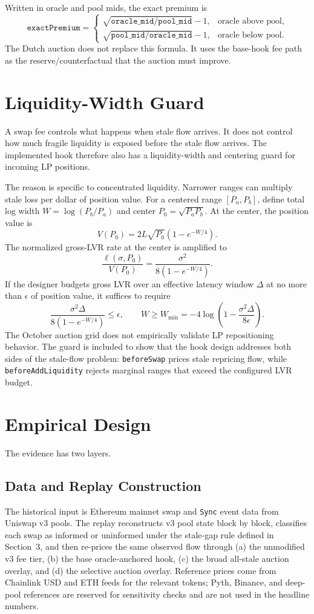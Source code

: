 \documentclass[11pt]{article}
\begin{document}
Written in oracle and pool mids, the exact premium is
\[
\texttt{exactPremium} =
\begin{cases}
\sqrt{\texttt{oracle\_mid}/\texttt{pool\_mid}} - 1, & \text{oracle above pool},\\
\sqrt{\texttt{pool\_mid}/\texttt{oracle\_mid}} - 1, & \text{oracle below pool}.
\end{cases}
\]
The Dutch auction does not replace this formula. It uses the base-hook fee path as the reserve/counterfactual that the auction must improve.

\section{Liquidity-Width Guard}
A swap fee controls what happens when stale flow arrives. It does not control how much fragile liquidity is exposed before the stale flow arrives. The implemented hook therefore also has a liquidity-width and centering guard for incoming LP positions.

The reason is specific to concentrated liquidity. Narrower ranges can multiply stale loss per dollar of position value. For a centered range \([P_a,P_b]\), define total log width \(W=\log(P_b/P_a)\) and center \(P_0=\sqrt{P_aP_b}\). At the center, the position value is
\[
V(P_0)=2L\sqrt{P_0}(1-e^{-W/4}).
\]
The normalized gross-LVR rate at the center is amplified to
\[
\frac{\ell(\sigma,P_0)}{V(P_0)}
=
\frac{\sigma^2}{8(1-e^{-W/4})}.
\]
If the designer budgets gross LVR over an effective latency window \(\Delta\) at no more than \(\epsilon\) of position value, it suffices to require
\[
\frac{\sigma^2\Delta}{8(1-e^{-W/4})} \leq \epsilon,
\qquad
W \geq W_{\min}
= -4\log\left(1-\frac{\sigma^2\Delta}{8\epsilon}\right).
\]
The October auction grid does not empirically validate LP repositioning behavior. The guard is included to show that the hook design addresses both sides of the stale-flow problem: \texttt{beforeSwap} prices stale repricing flow, while \texttt{beforeAddLiquidity} rejects marginal ranges that exceed the configured LVR budget.

\section{Empirical Design}
The evidence has two layers.

\subsection{Data and Replay Construction}
The historical input is Ethereum mainnet swap and \texttt{Sync} event data from Uniswap v3 pools. The replay reconstructs v3 pool state block by block, classifies each swap as informed or uninformed under the stale-gap rule defined in Section~3, and then re-prices the same observed flow through (a) the unmodified v3 fee tier, (b) the base oracle-anchored hook, (c) the broad all-stale auction overlay, and (d) the selective auction overlay. Reference prices come from Chainlink USD and ETH feeds for the relevant tokens; Pyth, Binance, and deep-pool references are reserved for sensitivity checks and are not used in the headline numbers.
\end{document}
